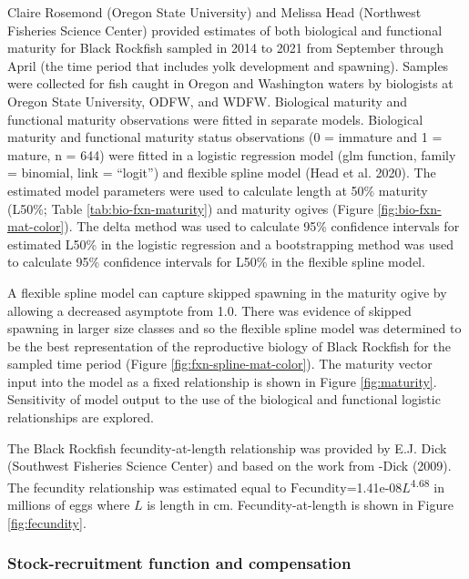 \documentclass[11pt,
  english,
  letterpaper,
]{article}
\begin{document}
Claire Rosemond (Oregon State University) and Melissa Head (Northwest Fisheries Science Center) provided estimates of both biological and functional maturity for Black Rockfish sampled in 2014 to 2021 from September through April (the time period that includes yolk development and spawning). Samples were collected for fish caught in Oregon and Washington waters by biologists at Oregon State University, ODFW, and WDFW. Biological maturity and functional maturity observations were fitted in separate models. Biological maturity and functional maturity status observations (0 = immature and 1 = mature, n = 644) were fitted in a logistic regression model (glm function, family = binomial, link = ``logit'') and flexible spline model (Head et al. 2020). The estimated model parameters were used to calculate length at 50\% maturity (L50\%; Table \ref{tab:bio-fxn-maturity}) and maturity ogives (Figure \ref{fig:bio-fxn-mat-color}). The delta method was used to calculate 95\% confidence intervals for estimated L50\% in the logistic regression and a bootstrapping method was used to calculate 95\% confidence intervals for L50\% in the flexible spline model.

A flexible spline model can capture skipped spawning in the maturity ogive by allowing a decreased asymptote from 1.0. There was evidence of skipped spawning in larger size classes and so the flexible spline model was determined to be the best representation of the reproductive biology of Black Rockfish for the sampled time period (Figure \ref{fig:fxn-spline-mat-color}). The maturity vector input into the model as a fixed relationship is shown in Figure \ref{fig:maturity}. Sensitivity of model output to the use of the biological and functional logistic relationships are explored.

The Black Rockfish fecundity-at-length relationship was provided by E.J. Dick (Southwest Fisheries Science Center) and based on the work from -Dick (2009). The fecundity relationship was estimated equal to \(\text{Fecundity}\)=1.41e-08\(L\)\textsuperscript{4.68} in millions of eggs where \(L\) is length in cm. Fecundity-at-length is shown in Figure \ref{fig:fecundity}.

\hypertarget{stock-recruitment-function-and-compensation}{%
\subsubsection{Stock-recruitment function and compensation}\label{stock-recruitment-function-and-compensation}}
\end{document}
